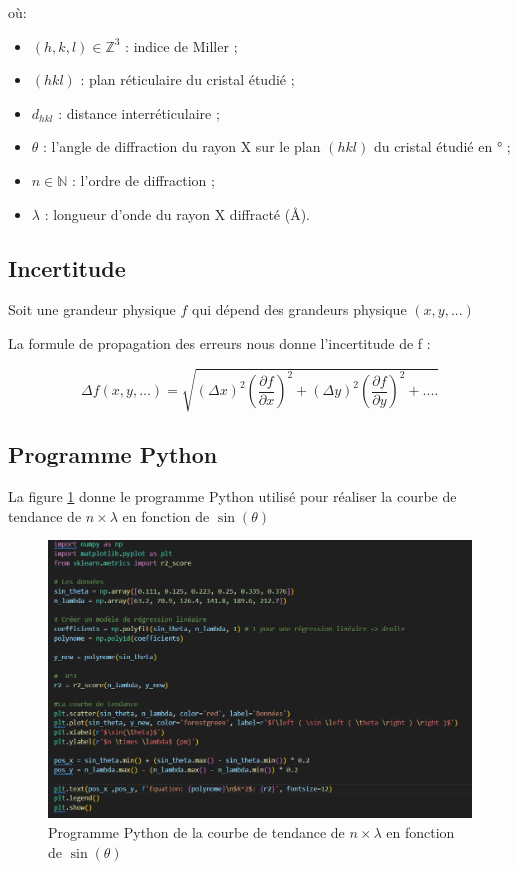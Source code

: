 \documentclass[12pt,a4paper]{article}
\begin{document}
où:

\begin{itemize}
	
		\item $\left ( h,k,l \right ) \in \mathbb{Z}^3$ : indice de Miller ;
	
	\item $(hkl)$ : plan réticulaire du cristal étudié ;
	
	\item $d_{hkl}$ : distance interréticulaire ;
	 
	
	\item $\theta $ : l'angle de diffraction du rayon X sur le plan $(hkl)$ du cristal étudié en ° ;
	
	\item $n \in \mathbb{N}$ : l'ordre de diffraction ;
	
	\item $\lambda $ : longueur d'onde du rayon X diffracté (\AA).
\end{itemize}
\subsection{Incertitude}
Soit une grandeur physique $f$ qui dépend des grandeurs physique $(x,y,...)$ 

La formule de propagation des erreurs nous donne l'incertitude de f :

\begin{equation}\label{eq: Type B}
	\Delta f(x,y,...) = \sqrt{\left ( \Delta x \right )^2 \left ( \frac{\partial f}{\partial x} \right )^2 + \left ( \Delta y \right )^2 \left ( \frac{\partial f}{\partial y} \right )^2 + .... }
\end{equation}

\newpage
\subsection{Programme Python}
La figure \ref{fig:photocode} donne le programme Python utilisé pour réaliser la courbe de tendance de $n \times \lambda$ en fonction de $\sin(\theta)$
\begin{figure}[h!]
	\centering
	\includegraphics[width=1\linewidth]{Python/Photo_code}
	\caption{Programme Python de la courbe de tendance de $n \times \lambda$ en fonction de $\sin(\theta)$}
	\label{fig:photocode}
\end{figure}
\end{document}
